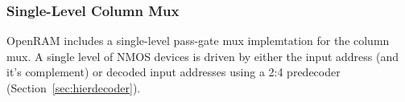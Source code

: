 


\subsubsection{Single-Level Column Mux}
\label{sec:single_level_column_mux}

OpenRAM includes a single-level pass-gate mux implemtation for the
column mux.  A single level of NMOS devices is driven by either the
input address (and it's complement) or decoded input addresses using a
2:4 predecoder (Section~\ref{sec:hierdecoder}).

